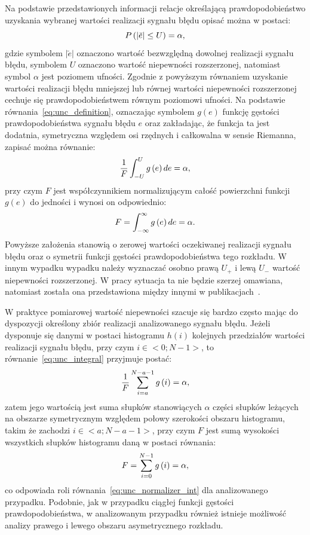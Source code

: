 Na podstawie przedstawionych informacji relacje określającą prawdopodobieństwo uzyskania wybranej wartości realizacji sygnału błędu opisać można w postaci:
\begin{equation}
P \left(|\breve{e}| \le U\right) = \alpha \label{eq:unc_definition},
\end{equation}
gdzie symbolem $|\breve{e}|$ oznaczono wartość bezwzględną dowolnej realizacji sygnału błędu, symbolem $U$ oznaczono wartość niepewności rozszerzonej, natomiast symbol $\alpha$ jest poziomem ufności. Zgodnie z powyższym równaniem uzyskanie wartości realizacji błędu mniejszej lub równej wartości niepewności rozszerzonej cechuje się prawdopodobieństwem równym poziomowi ufności. Na podstawie równania~\eqref{eq:unc_definition}, oznaczając symbolem $g(e)$ funkcję gęstości prawdopodobieństwa sygnału błędu $e$ oraz zakładając, że funkcja ta jest dodatnia, symetryczna względem osi rzędnych i całkowalna w sensie Riemanna, zapisać można równanie:
\begin{equation}
\frac{1}{F} \int _{-U} ^{U} g \left(e\right) de = \alpha \label{eq:unc_integral},
\end{equation}
przy czym $F$ jest współczynnikiem normalizującym całość powierzchni funkcji $g(e)$ do jedności i wynosi on odpowiednio:
\begin{equation}
F = \int _{-\infty} ^{\infty} g \left(e\right) de = \alpha \label{eq:unc_normalizer_int}.
\end{equation}
Powyższe założenia stanowią o zerowej wartości oczekiwanej realizacji sygnału błędu oraz o symetrii funkcji gęstości prawdopodobieństwa tego rozkładu. W innym wypadku wypadku należy wyznaczać osobno prawą $U_{+}$ i lewą $U_{-}$ wartość niepewności rozszerzonej. W pracy sytuacja ta nie będzie szerzej omawiana, natomiast została ona przedstawiona między innymi w publikacjach~\cite{roj_annuncertainty, wymyslo_range}.

W praktyce pomiarowej wartość niepewności szacuje się bardzo często mając do dyspozycji określony zbiór realizacji analizowanego sygnału błędu. Jeżeli dysponuje się danymi w postaci histogramu $h(i)$ kolejnych przedziałów wartości realizacji sygnału błędu, przy czym $i \in <0;N-1>$, to równanie~\eqref{eq:unc_integral} przyjmuje postać:
\begin{equation}
\frac{1}{F} \sum _{i=a} ^{N-a-1} g \left(i\right) = \alpha \label{eq:unc_summation},
\end{equation}
zatem jego wartością jest suma słupków stanowiących $\alpha$ części słupków leżących na obszarze symetrycznym względem połowy szerokości obszaru histogramu, takim że zachodzi $i \in <a;N-a-1>$, przy czym $F$ jest sumą wysokości wszystkich słupków histogramu daną w postaci równania:
\begin{equation}
F = \sum _{i=0} ^{N-1} g \left(i\right) = \alpha \label{eq:unc_normalizer_sum},
\end{equation}
co odpowiada roli równania~\eqref{eq:unc_normalizer_int} dla analizowanego przypadku. Podobnie, jak w przypadku ciągłej funkcji gęstości prawdopodobieństwa, w analizowanym przypadku również istnieje możliwość analizy prawego i lewego obszaru asymetrycznego rozkładu.

